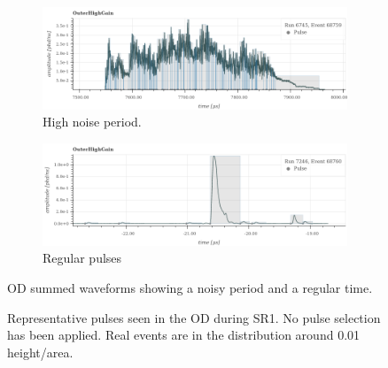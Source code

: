 \begin{figure}[]
\begin{subfigure}{\textwidth}
  \centering
  \includegraphics[width=\linewidth]{Figures/OD_Backgrounds/noise_pulse.png}
  \caption{High noise period.}
  \label{fig:noise_od_waveform}
  \end{subfigure}
  \begin{subfigure}{\textwidth}
  \centering
  \includegraphics[width=\linewidth]{Figures/OD_Backgrounds/regular_pulse.png}
  \caption{Regular pulses}
  \label{fig:regular_od_waveform}
  \end{subfigure}
\caption{OD summed waveforms showing a noisy period and a regular time.}
\label{fig:od_noise_cut_waveforms}
\end{figure}


\begin{figure}[]%
\centering
{}
\caption{Representative pulses seen in the OD during SR1.
         No pulse selection has been applied.
         Real events are in the distribution around 0.01 height/area.}
\label{fig:od_noise_cut}
\end{figure}